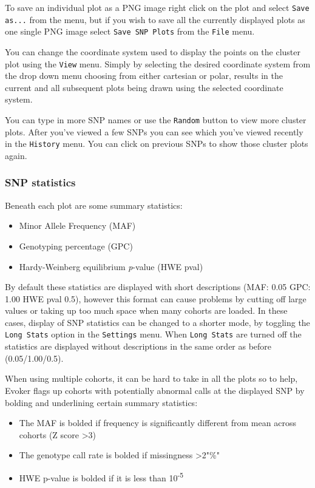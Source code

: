 \documentclass{article}
\begin{document}
To save an individual plot as a PNG image right click on the plot and select \texttt{Save as...} from the menu, but if you wish to save all the currently displayed plots as one single PNG image select \texttt{Save SNP Plots} from the \texttt{File} menu.

You can change the coordinate system used to display the points on the cluster plot using the \texttt{View} menu. Simply by selecting the desired coordinate system from the drop down menu choosing from either cartesian or polar, results in the current and all subsequent plots being drawn using the selected coordinate system. 

You can type in more SNP names or use the \texttt{Random} button to view more cluster plots. After you've viewed a few SNPs you can see which you've viewed recently in the \texttt{History} menu. You can click on previous SNPs to show those cluster plots again.

\subsubsection{SNP statistics}
Beneath each plot are some summary statistics: 
\begin{itemize}
\item{Minor Allele Frequency (MAF)}
\item{Genotyping percentage (GPC)}
\item{Hardy-Weinberg equilibrium \emph{p}-value (HWE pval)}
\end{itemize}
By default these statistics are displayed with short descriptions (MAF: 0.05 GPC: 1.00 HWE pval 0.5), however this format can cause problems by cutting off large values or taking up too much space when many cohorts are loaded. In these cases, display of SNP statistics can be changed to a shorter mode, by toggling the \texttt{Long Stats} option in the \texttt{Settings} menu. When \texttt{Long Stats} are turned off the statistics are displayed without descriptions in the same order as before (0.05/1.00/0.5).

When using multiple cohorts, it can be hard to take in all the plots so to help, Evoker flags up cohorts with potentially abnormal calls at the displayed SNP by bolding and underlining certain summary statistics:
\begin{itemize}
	\item{The MAF is bolded if frequency is significantly different from mean across cohorts (Z score \textgreater 3)}
	\item{The genotype call rate is bolded if missingness \textgreater 2"\%"}
	\item{HWE p-value is bolded if it is less than 10\textsuperscript{-5}}
\end{itemize}
\end{document}
